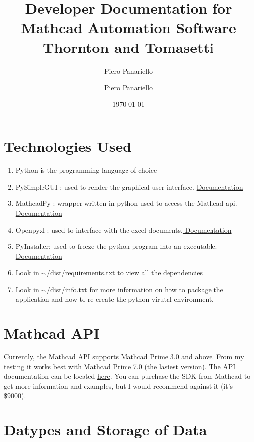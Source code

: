 \documentclass[11pt]{article}
\author{Piero Panariello}
\author{Piero Panariello}
\date{\today}
\title{Developer Documentation for Mathcad Automation Software\\\medskip
\large Thornton and Tomasetti}
\begin{document}
\maketitle
\tableofcontents


\section{Technologies Used}
\label{sec:org6dd1b6f}
\begin{enumerate}
\item Python is the programming language of choice
\item PySimpleGUI : used to render the graphical user interface. \href{https://pysimplegui.readthedocs.io/en/latest/}{Documentation}
\item MathcadPy : wrapper written in python used to access the Mathcad api. \href{https://github.com/MattWoodhead/MathcadPy/blob/master/MathcadPy/\_application.py}{Documentation}
\item Openpyxl : used to interface with the excel documents.\href{https://openpyxl.readthedocs.io/en/stable/}{ Documentation}
\item PyInstaller: used to freeze the python program into an executable.\href{https://pyinstaller.readthedocs.io/en/stable/}{ Documentation}
\item Look in \textasciitilde{}./dist/requirements.txt to view all the dependencies
\item Look in \textasciitilde{}./dist/info.txt for more information on how to package the application and how to re-create the python virutal environment.
\end{enumerate}

\section{Mathcad API}
\label{sec:org28a2280}
Currently, the Mathcad API supports Mathcad Prime 3.0 and above. From my testing it works best with Mathcad Prime 7.0 (the lastest version). The API documentation can be located \href{https://support.ptc.com/help/mathcad/r7.0/en/index.html\#page/PTC\_Mathcad\_Help\%2Fmathcad\_and\_automation\_api.html\%23}{here}. You can purchase the SDK from Mathcad to get more information and examples, but I would recommend against it (it's \$9000).
\section{Datypes and Storage of Data}
\label{sec:org129ae49}
\end{document}
